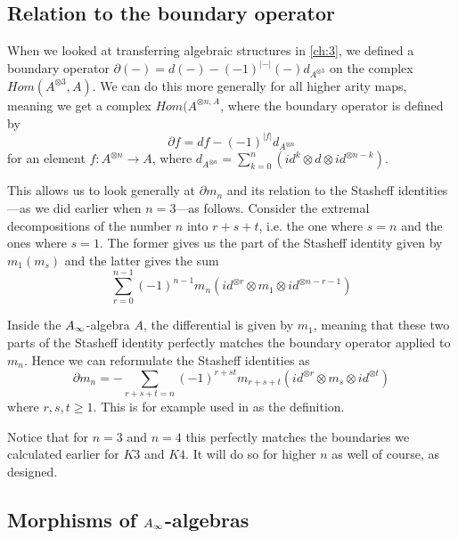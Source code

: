 
\subsection*{Relation to the boundary operator}

When we looked at transferring algebraic structures in \ref{ch:3}, we defined a boundary operator $\partial (-) = d(-)-(-1)^{|-|}(-)d_{A^{\otimes 3}}$ on the complex $Hom(A^{\otimes 3}, A)$. We can do this more generally for all higher arity maps, meaning we get a complex $Hom(A^{\otimes n, A}$, where the boundary operator is defined by
\begin{equation*}
    \partial f = df -(-1)^{|f|}d_{A^{\otimes n}}
\end{equation*}
for an element $f\colon A^{\otimes n}\longrightarrow A$, where $d_{A^{\otimes n}}= \sum_{k=0}^{n}(id^{k}\otimes d\otimes id^{\otimes n-k})$. 

This allows us to look generally at $\partial m_n$ and its relation to the Stasheff identities---as we did earlier when $n=3$---as follows. Consider the extremal decompositions of the number $n$ into $r+s+t$, i.e. the one where $s=n$ and the ones where $s=1$. The former gives us the part of the Stasheff identity given by $m_1(m_s)$ and the latter gives the sum 
\begin{equation*}
    \sum_{r=0}^{n-1} (-1)^{n-1}m_n(id^{\otimes r}\otimes m_1\otimes id^{\otimes n-r-1})
\end{equation*}

Inside the $A_{\infty}$-algebra $A$, the differential is given by $m_1$, meaning that these two parts of the Stasheff identity perfectly matches the boundary operator applied to $m_n$. Hence we can reformulate the Stasheff identities as
\begin{equation*}
    \partial m_n = - \sum_{r+s+t=n}(-1)^{r+st}m_{r+s+t}(id^{\otimes r}\otimes m_s\otimes id^{\otimes t})
\end{equation*}
where $r,s,t\geq 1$. This is for example used in \cite{AHO} as the definition. 

Notice that for $n=3$ and $n=4$ this perfectly matches the boundaries we calculated earlier for $K3$ and $K4$. It will do so for higher $n$ as well of course, as designed. 


\subsection{Morphisms of \texorpdfstring{$A_{\infty}$}{A}-algebras}
\label{ssec:A_infinity-morphisms}

